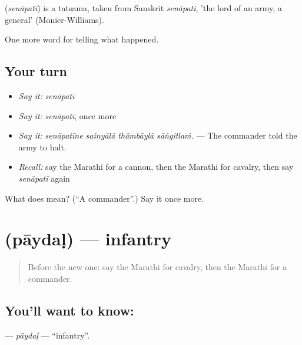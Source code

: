 \begin{cousinweb}
\textbf{} (\emph{senāpatī}) is a tatsama, taken from Sanskrit \emph{senāpati}, 'the lord of an army, a general' (Monier-Williams).
\end{cousinweb}

\begin{grammarlens}[title={What you've built}]
One more word for telling what happened.
\end{grammarlens}

\subsection*{Your turn}
\begin{itemize}
\raggedright
  \item \emph{Say it:} \emph{senāpatī}
  \item \emph{Say it:} \emph{senāpatī}, once more
  \item \emph{Say it:} \emph{senāpatīne sainyālā thāmbāylā sāṅgitlaṁ.} — The commander told the army to halt.
  \item \emph{Recall:} say the Marathi for a cannon, then the Marathi for cavalry, then say \emph{senāpatī} again
\end{itemize}

\begin{tcolorbox}[breakable,colback=teal!4,colframe=teal!35!black,title={Before you move on}]
What does  mean? (\textquotedblleft{}A commander\textquotedblright{}.) Say it once more.
\end{tcolorbox}
\section[\texorpdfstring{\mr{पायदळ} (pāydaḷ)}{पायदळ (pāydaḷ)}]{ (pāydaḷ) — infantry}

\label{lesson:MR-C330-paydal}



\begin{quote}
Before the new one: say the Marathi for cavalry, then the Marathi for a commander.
\end{quote}

\subsection*{You'll want to know: }
\textbf{} — \emph{pāydaḷ} — \textquotedblleft{}infantry\textquotedblright{}.

